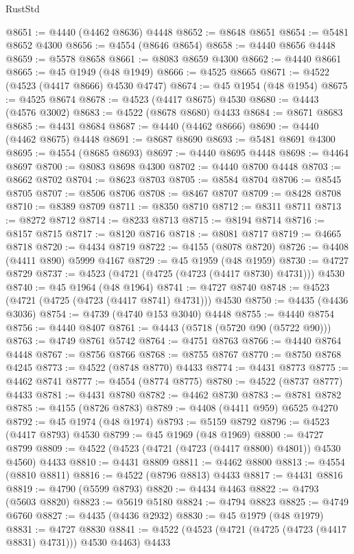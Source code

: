 \begin{lexlean}{RustStd}
\begin{coremodule}
@8651 := @4440 (@4462 @8636) @4448
@8652 := @8648 @8651
@8654 := @5481 @8652 @4300
@8656 := @4554 (@8646 @8654)
@8658 := @4440 @8656 @4448
@8659 := @5578 @8658
@8661 := @8083 @8659 @4300
@8662 := @4440 @8661
@8665 := @45 @1949 (@48 @1949)
@8666 := @4525 @8665
@8671 := @4522 (@4523 (@4417 @8666) @4530 @4747)
@8674 := @45 @1954 (@48 @1954)
@8675 := @4525 @8674
@8678 := @4523 (@4417 @8675) @4530
@8680 := @4443 (@4576 @3002)
@8683 := @4522 (@8678 @8680) @4433
@8684 := @8671 @8683
@8685 := @4431 @8684
@8687 := @4440 (@4462 @8666)
@8690 := @4440 (@4462 @8675) @4448
@8691 := @8687 @8690
@8693 := @5481 @8691 @4300
@8695 := @4554 (@8685 @8693)
@8697 := @4440 @8695 @4448
@8698 := @4464 @8697
@8700 := @8083 @8698 @4300
@8702 := @4440 @8700 @4448
@8703 := @8662 @8702
@8704 := @8623 @8703
@8705 := @8584 @8704
@8706 := @8545 @8705
@8707 := @8506 @8706
@8708 := @8467 @8707
@8709 := @8428 @8708
@8710 := @8389 @8709
@8711 := @8350 @8710
@8712 := @8311 @8711
@8713 := @8272 @8712
@8714 := @8233 @8713
@8715 := @8194 @8714
@8716 := @8157 @8715
@8717 := @8120 @8716
@8718 := @8081 @8717
@8719 := @4665 @8718
@8720 := @4434 @8719
@8722 := @4155 (@8078 @8720)
@8726 := @4408 (@4411 @890) @5999 @4167
@8729 := @45 @1959 (@48 @1959)
@8730 := @4727 @8729
@8737 := @4523 (@4721 (@4725 (@4723 (@4417 @8730) @4731))) @4530
@8740 := @45 @1964 (@48 @1964)
@8741 := @4727 @8740
@8748 := @4523 (@4721 (@4725 (@4723 (@4417 @8741) @4731))) @4530
@8750 := @4435 (@4436 @3036)
@8754 := @4739 (@4740 @153 @3040) @4448
@8755 := @4440 @8754
@8756 := @4440 @8407
@8761 := @4443 (@5718 (@5720 @90 (@5722 @90)))
@8763 := @4749 @8761 @5742
@8764 := @4751 @8763
@8766 := @4440 @8764 @4448
@8767 := @8756 @8766
@8768 := @8755 @8767
@8770 := @8750 @8768 @4245
@8773 := @4522 (@8748 @8770) @4433
@8774 := @4431 @8773
@8775 := @4462 @8741
@8777 := @4554 (@8774 @8775)
@8780 := @4522 (@8737 @8777) @4433
@8781 := @4431 @8780
@8782 := @4462 @8730
@8783 := @8781 @8782
@8785 := @4155 (@8726 @8783)
@8789 := @4408 (@4411 @959) @6525 @4270
@8792 := @45 @1974 (@48 @1974)
@8793 := @5159 @8792
@8796 := @4523 (@4417 @8793) @4530
@8799 := @45 @1969 (@48 @1969)
@8800 := @4727 @8799
@8809 := @4522 (@4523 (@4721 (@4723 (@4417 @8800) @4801)) @4530 @4560) @4433
@8810 := @4431 @8809
@8811 := @4462 @8800
@8813 := @4554 (@8810 @8811)
@8816 := @4522 (@8796 @8813) @4433
@8817 := @4431 @8816
@8819 := @4790 (@5599 @8793)
@8820 := @4434 @4463
@8822 := @4793 (@5603 @8820)
@8823 := @5619 @5180
@8824 := @4794 @8823
@8825 := @4749 @6760
@8827 := @4435 (@4436 @2932)
@8830 := @45 @1979 (@48 @1979)
@8831 := @4727 @8830
@8841 := @4522 (@4523 (@4721 (@4725 (@4723 (@4417 @8831) @4731))) @4530 @4463) @4433

\end{coremodule}
\end{lexlean}
